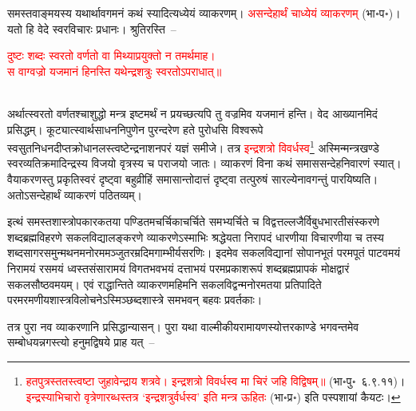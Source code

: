 \begin{sloppypar}\justifying\noindent\hspace{10mm} समस्त\-वाङ्मयस्य यथार्थावगमनं कथं स्यादित्यध्येयं व्याकरणम्। \textcolor{red}{असन्देहार्थं चाध्येयं व्याकरणम्} (भा॰प॰)। यतो हि वेदे स्वर\-विचारः प्रधानः। श्रुतिरस्ति~–\end{sloppypar}
\centering\textcolor{red}{दुष्टः शब्दः स्वरतो वर्णतो वा मिथ्याप्रयुक्तो न तमर्थमाह। \nopagebreak\\
स वाग्वज्रो यजमानं हिनस्ति यथेन्द्रशत्रुः स्वरतोऽपराधात्॥}\nopagebreak\\
\\
\begin{sloppypar}\justifying\noindent\hspace{10mm} अर्थात्स्वरतो वर्णतश्चाशुद्धो मन्त्र इष्टमर्थं न प्रयच्छत्यपि तु वज्रमिव यजमानं हन्ति। वेद आख्यानमिदं प्रसिद्धम्। कूट्यात्स्वार्थ\-साधन\-निपुणेन पुरन्दरेण हते पुरोधसि विश्वरूपे स्वसुत\-निधन\-दीप्त\-क्रोधानलस्त्वष्टेन्द्र\-नाशन\-परं यज्ञं समीजे। तत्र \textcolor{red}{इन्द्रशत्रो विवर्धस्व}\footnote{\textcolor{red}{हतपुत्रस्ततस्त्वष्टा जुहावेन्द्राय शत्रवे। इन्द्रशत्रो विवर्धस्व मा चिरं जहि विद्विषम्॥} (भा॰पु॰~६.९.११)। \textcolor{red}{इन्द्रस्याभिचारो वृत्रेणारब्धस्तत्र ‘इन्द्रशत्रुर्वर्धस्व’ इति मन्त्र ऊहितः} (भा॰प्र॰) इति पस्पशायां कैयटः।} अस्मिन्मन्त्र\-खण्डे स्वर\-व्यतिक्रमादिन्द्रस्य विजयो वृत्रस्य च पराजयो जातः। व्याकरणं विना कथं समास\-सन्देह\-निवारणं स्यात्। वैयाकरणस्तु प्रकृति\-स्वरं दृष्ट्वा बहुव्रीहिं समासान्तोदात्तं दृष्ट्वा तत्पुरुषं सारल्येनावगन्तुं पारयिष्यति। अतोऽसन्देहार्थं व्याकरणं पठितव्यम्। \end{sloppypar}
\begin{sloppypar}\justifying\noindent\hspace{10mm} इत्थं समस्त\-शास्त्रोपकारक\-तया पण्डित\-मचर्चिका\-चर्चिते समभ्यर्चिते च विद्वत्तल्लजैर्विबुध\-भारती\-संस्करणे शब्द\-ब्रह्म\-विहरणे सकल\-विद्यालङ्करणे व्याकरणेऽस्माभिः श्रद्धेयता निरापदं धारणीया विचारणीया च तस्य शब्द\-सागर\-समुन्मथन\-मनोरम\-मञ्जुतर\-म्रदिम\-गाम्भीर्य\-सरणिः। इदमेव सकल\-विद्यानां सोपान\-भूतं परम\-पूतं पाटवमयं निरामयं रसमयं ध्वस्त\-संसारामयं विगत\-भव\-भयं दत्ताभयं परम\-प्रकाशरूपं शब्द\-ब्रह्म\-प्रापकं मोक्ष\-द्वारं सकल\-सौष्ठवमयम्। एवं राद्धान्तिते व्याकरण\-महिमनि सकल\-विद्वन्मनोरम\-तया प्रति\-पादिते परम\-रमणीय\-शास्त्र\-विलोचनेऽस्मिञ्छब्द\-शास्त्रे समभवन् बहवः प्रवर्तकाः। \end{sloppypar}
\begin{sloppypar}\justifying\noindent\hspace{10mm} तत्र पुरा नव व्याकरणानि प्रसिद्धान्यासन्। पुरा यथा वाल्मीकीय\-रामायणस्योत्तरकाण्डे भगवन्तमेव सम्बोधयन्नगस्त्यो हनुमद्विषये प्राह यत्~–\end{sloppypar}
